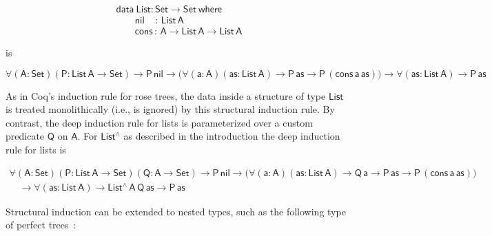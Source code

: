 \documentclass[9pt]{entcs}
\begin{document}
\vspace*{-0.1in}

\begin{equation*}\label{eq:list}
\begin{array}{l}
\mathsf{data\ List : Set \to Set\ where}\\
\mathsf{\;\;\;\;\;\;\;nil\,\,\,\,\,\; :\, List\,A}\\
\mathsf{\;\;\;\;\;\;\;cons\, :\, A \to List\,A \to List\,A} 
\end{array}
\end{equation*}

\vspace*{-0.1in}

\noindent
is

\vspace*{-0.2in}

\begin{equation*}
\mathsf{
\forall (A : Set) (P : List\,A \to Set)
\to P\,nil
\to \big( \forall (a : A) (as: List\,A)
\to P\,as
\to P\,(cons\,a\,as)\big)
\to \forall (as : List\,A)
\to P\, as
}
\end{equation*}

\vspace*{-0.1in}

\noindent
As in Coq's induction rule for rose trees, the data inside a structure
of type $\mathsf{List}$ is treated monolithically (i.e., is ignored)
by this structural induction rule.  By contrast, the deep induction
rule for lists is parameterized over a custom predicate $\mathsf{Q}$
on $\mathsf{A}$. For $\mathsf{List^\wedge}$ as described in the
introduction the deep induction rule for lists is

\vspace*{-0.2in}

\[\begin{array}{l}
\mathsf{\forall (A : Set) (P : List\, A \to Set) (Q : A \to Set)
\to P\,nil \to \big( \forall (a : A) (as: List\,A) \to Q\,a \to P\,as
\to P\,(cons\,a\,as)\big)} \\ 
\quad\mathsf{\to \forall (as : List\,A) \to List^{\wedge}\,A\,Q\,as
  \to P\,as } 
\end{array}\]

\vspace*{-0.1in}

Structural induction can be extended to nested types, such as the
following type of perfect trees~\cite{bm98}:
\end{document}
